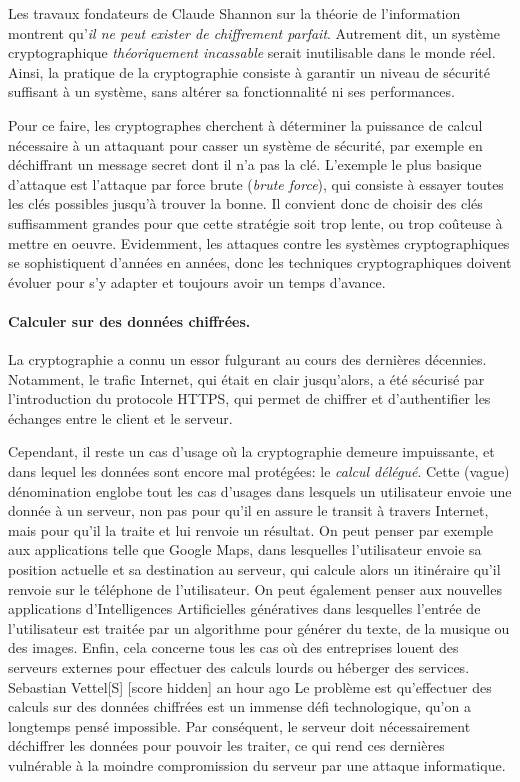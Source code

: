 Les travaux fondateurs de Claude Shannon sur la théorie de l'information montrent qu'\textit{il ne peut exister de chiffrement parfait}. Autrement dit, un système cryptographique \textit{théoriquement incassable} serait inutilisable dans le monde réel. Ainsi, la pratique de la cryptographie consiste à garantir un niveau de sécurité suffisant à un système, sans altérer sa fonctionnalité ni ses performances.

Pour ce faire, les cryptographes cherchent à déterminer la puissance de calcul nécessaire à un attaquant pour casser un système de sécurité, par exemple en déchiffrant un message secret dont il n'a pas la clé. L'exemple le plus basique d'attaque est l'attaque par force brute (\textit{brute force}), qui consiste à essayer toutes les clés possibles jusqu'à trouver la bonne. Il convient donc de choisir des clés suffisamment grandes pour que cette stratégie soit trop lente, ou trop coûteuse à mettre en oeuvre. Evidemment, les attaques contre les systèmes cryptographiques se sophistiquent d'années en années, donc les techniques cryptographiques doivent évoluer pour s'y adapter et toujours avoir un temps d'avance.



\paragraph{Calculer sur des données chiffrées.}
La cryptographie a connu un essor fulgurant au cours des dernières décennies. Notamment, le trafic Internet, qui était en clair jusqu'alors, a été sécurisé par l'introduction du protocole HTTPS, qui permet de chiffrer et d'authentifier les échanges entre le client et le serveur.

Cependant, il reste un cas d'usage où la cryptographie demeure impuissante, et dans lequel les données sont encore mal protégées: le \textit{calcul délégué}. Cette (vague) dénomination englobe tout les cas d'usages dans lesquels un utilisateur envoie une donnée à un serveur, non pas pour qu'il en assure le transit à travers Internet, mais pour qu'il la traite et lui renvoie un résultat. On peut penser par exemple aux applications telle que Google Maps, dans lesquelles l'utilisateur envoie sa position actuelle et sa destination au serveur, qui calcule alors un itinéraire qu'il renvoie sur le téléphone de  l'utilisateur. On peut également penser aux nouvelles applications d'Intelligences Artificielles génératives dans lesquelles l'entrée de l'utilisateur est traitée par un algorithme pour générer du texte, de la musique ou des images. Enfin, cela concerne tous les cas où des entreprises louent des serveurs externes pour effectuer des calculs lourds ou héberger des services.
 Sebastian Vettel[S] [score hidden] an hour ago 
Le problème est qu'effectuer des calculs sur des données chiffrées est un immense défi technologique, qu'on a longtemps pensé impossible. Par conséquent, le serveur doit nécessairement déchiffrer les données pour pouvoir les traiter, ce qui rend ces dernières vulnérable à la moindre compromission du serveur par une attaque informatique.


